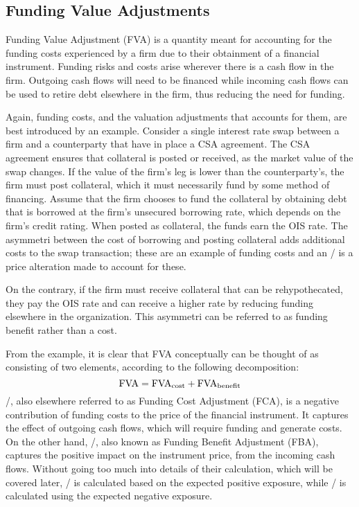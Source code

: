 \documentclass[main.tex]{subfiles}
\begin{document}
    \subsection{Funding Value Adjustments}
        Funding Value Adjustment (FVA) is a quantity meant for accounting for the funding costs 
        experienced by a firm due to their obtainment of a financial instrument.
        Funding risks and costs arise wherever there is a cash flow in the firm. 
        Outgoing cash flows will need to be financed while incoming cash flows
        can be used to retire debt elsewhere in the firm, thus reducing the need for funding.

        Again, funding costs, and the valuation adjustments that accounts for them,
        are best introduced by an example.
        Consider a single interest rate swap between a firm and a counterparty that have in place a CSA agreement.
        The CSA agreement ensures that collateral is posted or received,
        as the market value of the swap changes.
        If the value of the firm's leg is lower than the counterparty's,
        the firm must post collateral, which it must necessarily fund by some method of financing.
        Assume that the firm chooses to fund the collateral by obtaining debt
        that is borrowed at the firm's unsecured borrowing rate, which depends on the firm's credit rating.
        When posted as collateral, the funds earn the OIS rate.
        The asymmetri between the cost of borrowing and posting collateral
        adds additional costs to the swap transaction; 
        these are an example of funding costs and an \FVA/ is a price alteration made to account for these.

        On the contrary, if the firm must receive collateral that can be rehypothecated,
        they pay the OIS rate and can receive a higher rate
        by reducing funding elsewhere in the organization.
        This asymmetri can be referred to as funding benefit rather than a cost.
        
        From the example, it is clear that FVA conceptually can be thought of 
        as consisting of two elements, according to the following decomposition:
        \begin{equation}
            \FVA/ = \FCA/ + \FBA/
        \end{equation}
        \FCA/, also elsewhere referred to as Funding Cost Adjustment (FCA), 
        is a negative contribution of funding costs to the price of the financial instrument.
        It captures the effect of outgoing cash flows, which will require funding and generate costs.
        On the other hand, \FBA/, also known as Funding Benefit Adjustment (FBA), 
        captures the positive impact on the instrument price, from the incoming cash flows.
        Without going too much into details of their calculation, which will be covered later,
        \FCA/ is calculated based on the expected positive exposure, 
        while \FBA/ is calculated using the expected negative exposure. 
\end{document}
